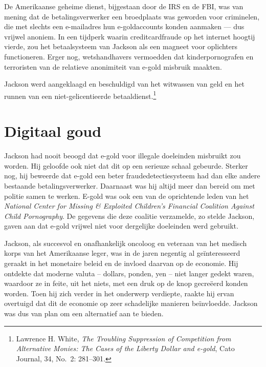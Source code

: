 \documentclass[
  a5paper,
  smalldemyvopaper,11pt,twoside,onecolumn,openright,extrafontsizes,
hidelinks]{memoir}
\begin{document}
De Amerikaanse geheime dienst, bijgestaan door de IRS en de FBI, was van
mening dat de betalingsverwerker een broedplaats was geworden voor
criminelen, die met slechts een e-mailadres hun e-goldaccounts konden
aanmaken --- dus vrijwel anoniem. In een tijdperk waarin
creditcardfraude op het internet hoogtij vierde, zou het betaalsysteem
van Jackson als een magneet voor oplichters functioneren. Erger nog,
wetshandhavers vermoedden dat kinderpornografen en terroristen van de
relatieve anonimiteit van e-gold misbruik maakten.

Jackson werd aangeklaagd en beschuldigd van het witwassen van geld en
het runnen van een niet-gelicentieerde betaaldienst.\footnote{\hspace{0pt}Lawrence
  H. White, \emph{The Troubling Suppression of Competition from
  Alternative Monies: The Cases of the Liberty Dollar and e-gold}, Cato
  Journal, 34, No.~2: 281--301.}

\vspace{-1em}

\section*{Digitaal goud}\label{digitaal-goud}


Jackson had nooit beoogd dat e-gold voor illegale doeleinden misbruikt
zou worden. Hij geloofde ook niet dat dit op een serieuze schaal
gebeurde. Sterker nog, hij beweerde dat e-gold een beter
fraudedetectiesysteem had dan elke andere bestaande betalingsverwerker.
Daarnaast was hij altijd meer dan bereid om met politie samen te werken.
E-gold was ook een van de oprichtende leden van het \emph{National
Center for Missing \& Exploited Children's Financial Coalition Against
Child Pornography}. De gegevens die deze coalitie verzamelde, zo stelde
Jackson, gaven aan dat e-gold vrijwel niet voor dergelijke doeleinden
werd gebruikt.

Jackson, als succesvol en onafhankelijk oncoloog en veteraan van het
medisch korps van het Amerikaanse leger, was in de jaren negentig al
geïnteresseerd geraakt in het monetaire beleid en de invloed daarvan op
de economie. Hij ontdekte dat moderne valuta -- dollars, ponden, yen --
niet langer gedekt waren, waardoor ze in feite, uit het niets, met een
druk op de knop gecreëerd konden worden. Toen hij zich verder in het
onderwerp verdiepte, raakte hij ervan overtuigd dat dit de economie op
zeer schadelijke manieren beïnvloedde. Jackson was dus van plan om een
alternatief aan te bieden.
\end{document}
